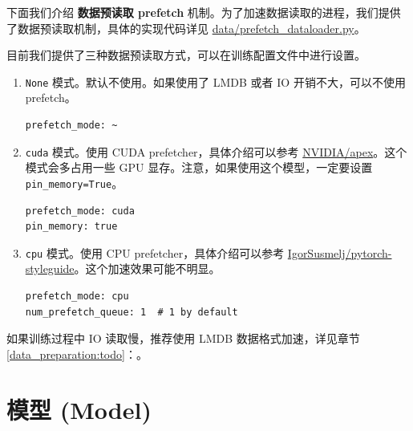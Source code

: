 \documentclass[../main.tex]{subfiles}
\begin{document}
下面我们介绍 \textbf{数据预读取 prefetch} 机制。为了加速数据读取的进程，我们提供了数据预读取机制，具体的实现代码详见 \href{https://github.com/XPixelGroup/BasicSR/blob/master/basicsr/data/prefetch\_dataloader.py}{data/prefetch\_dataloader.py}。

目前我们提供了三种数据预读取方式，可以在训练配置文件中进行设置。

\begin{enumerate}
    \item \texttt{None} 模式。默认不使用。如果使用了 LMDB 或者 IO 开销不大，可以不使用 prefetch。
          \begin{verbatim}
prefetch_mode: ~
          \end{verbatim}

    \item \texttt{cuda} 模式。使用 CUDA prefetcher，具体介绍可以参考 \href{https://github.com/NVIDIA/apex/issues/304#}{NVIDIA/apex}。这个模式会多占用一些 GPU 显存。注意，如果使用这个模型，一定要设置 \texttt{pin\_memory=True}。
          \begin{verbatim}
prefetch_mode: cuda
pin_memory: true
          \end{verbatim}

    \item \texttt{cpu} 模式。使用 CPU prefetcher，具体介绍可以参考 \href{https://github.com/IgorSusmelj/pytorch-styleguide/issues/5#}{IgorSusmelj/pytorch-styleguide}。这个加速效果可能不明显。
          \begin{verbatim}
prefetch_mode: cpu
num_prefetch_queue: 1  # 1 by default
          \end{verbatim}
\end{enumerate}

\begin{note} %
    如果训练过程中 IO 读取慢，推荐使用 LMDB 数据格式加速，详见章节\ref{data_preparation:todo}：。 
\end{note}

\section{模型 (Model)}\label{code_structure:model}

\end{document}
